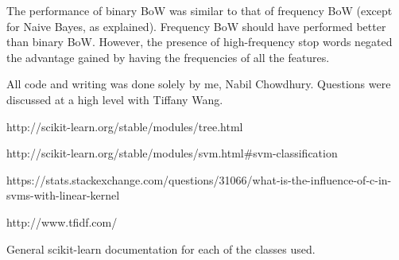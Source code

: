 \documentclass{article}
\begin{document}
The performance of binary BoW was similar to that of frequency BoW (except for Naive Bayes, as explained). Frequency BoW should have performed better than binary BoW. However, the presence of high-frequency stop words negated the advantage gained by having the frequencies of all the features. 

\begin{thebibliography}{9}
All code and writing was done solely by me, Nabil Chowdhury. Questions were discussed at a high level with Tiffany Wang.

http://scikit-learn.org/stable/modules/tree.html

http://scikit-learn.org/stable/modules/svm.html\#svm-classification

https://stats.stackexchange.com/questions/31066/what-is-the-influence-of-c-in-svms-with-linear-kernel

http://www.tfidf.com/

General scikit-learn documentation for each of the classes used.

\end{thebibliography}
\end{document}
